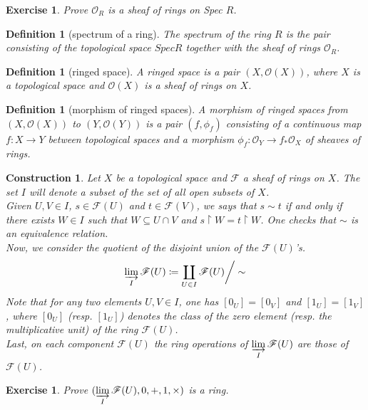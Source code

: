 \documentclass[12pt]{article}
\newtheorem{definition}[proposition]{Definition}
\newtheorem{ex}[proposition]{Exercise}
\newtheorem{construction}[proposition]{Construction}
\begin{document}
\begin{ex}
	Prove $\mathscr{O}_R$ is a sheaf of rings on Spec $R$. 
\end{ex}			

\begin{definition}[spectrum of a ring]
	The spectrum of the ring $R$ is the pair consisting of the topological space $Spec R$ together with the sheaf of rings $\mathscr{O}_R$.
\end{definition}

\begin{definition}[ringed space]
	A ringed space is a pair $(X, \mathscr{O}(X))$, where $X$ is a topological space and $\mathscr{O}(X)$ is a sheaf of rings on $X$.
\end{definition}

\begin{definition}[morphism of ringed spaces]
	A morphism of ringed spaces from $(X, \mathscr{O}(X))$ to $(Y, \mathscr{O}(Y))$ is a pair $(f, \phi_f)$ consisting of a continuous map $f: X \rightarrow Y$ between topological spaces and a morphism $\phi_f: \mathscr{O}_Y \rightarrow f_{*} \mathscr{O}_X$ of sheaves of rings.   
\end{definition}

\begin{construction}
	Let $X$ be a topological space and $\mathscr{F}$ a sheaf of rings on $X$. The set $I$ will denote a subset of the set of all open subsets of $X$. \\
	Given $U, V \in I$, $s \in \mathscr{F}(U)$ and $t \in \mathscr{F}(V)$,  we says that 
	$s \sim t$ if and only if there exists $W \in I$ such that $W \subseteq U \cap V$ and $s \restriction W = t \restriction W$. One checks that $\sim$ is an equivalence relation. \\
	Now, we consider the quotient of the disjoint union of the $\mathscr{F}(U)$'s.
	\[
	\varinjlim_I \mathscr{F}(U) \coloneqq \coprod_{U \in I} \mathscr{F}(U) \bigg/ \sim 
	\]
	Note that for any two elements $U, V \in I$, one has $[0_U] = [0_V]$ and $[1_U] = [1_V]$, where $[0_U]$ (\textit{resp.} $[1_U]$) denotes the class of the zero element (\textit{resp.} the multiplicative unit) of the ring $\mathscr{F}(U)$. \\
	Last, on each component $\mathscr{F}(U)$ the ring operations of $\displaystyle \varinjlim_{I} \mathscr{F}(U)$ are those of $\mathscr{F}(U)$. 
\end{construction}

\begin{ex}
	Prove $(\displaystyle \varinjlim_I \mathscr{F}(U), 0, +, 1, \times)$ is a ring. 
\end{ex}
\end{document}
